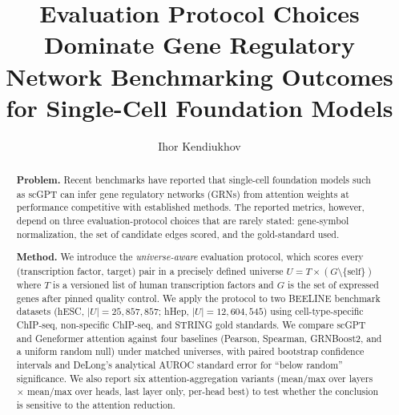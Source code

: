 \documentclass[sigconf]{acmart}
\begin{document}
\title[Protocol Choices Dominate GRN Benchmarking]{Evaluation Protocol Choices Dominate Gene Regulatory Network Benchmarking Outcomes for Single-Cell Foundation Models}

\author{Ihor Kendiukhov}

\begin{abstract}
\textbf{Problem.} Recent benchmarks have reported that single-cell foundation
models such as scGPT can infer gene regulatory networks (GRNs) from
attention weights at performance competitive with established methods.
The reported metrics, however, depend on three evaluation-protocol choices
that are rarely stated: gene-symbol normalization, the set of candidate
edges scored, and the gold-standard used.

\textbf{Method.} We introduce the \emph{universe-aware} evaluation protocol,
which scores every (transcription factor, target) pair in a precisely
defined universe $U = T \times (G \setminus \{\text{self}\})$ where $T$
is a versioned list of human transcription factors and $G$ is the set of
expressed genes after pinned quality control. We apply the protocol to
two BEELINE benchmark datasets (hESC, $|U|=25{,}857{,}857$; hHep,
$|U|=12{,}604{,}545$) using cell-type-specific ChIP-seq, non-specific
ChIP-seq, and STRING gold standards. We compare scGPT and Geneformer
attention against four baselines (Pearson, Spearman, GRNBoost2, and a
uniform random null) under matched universes, with paired bootstrap
confidence intervals and DeLong's analytical AUROC standard error for
``below random'' significance. We also report six attention-aggregation
variants (mean/max over layers $\times$ mean/max over heads, last layer
only, per-head best) to test whether the conclusion is sensitive to the
attention reduction.


\end{abstract}
\end{document}
